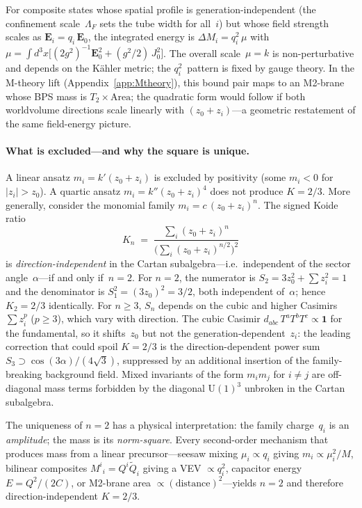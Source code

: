 \documentclass[12pt,a4paper]{article}
\newcommand{\UU}{\mathrm{U}}
\begin{document}
For composite states whose spatial profile is generation-independent
(the confinement scale~$\Lambda_F$ sets the tube width for all~$i$)
but whose field strength scales as $\mathbf{E}_i = q_i\,
\mathbf{E}_0$, the integrated energy is
$\Delta M_i = q_i^2\,\mu$ with
$\mu = \!\int\!d^3x\bigl[(2g^2)^{-1}\mathbf{E}_0^2
+ (g^2/2)\,J_0^2\bigr]$.
The overall scale~$\mu = k$ is non-perturbative and depends on
the K\"ahler metric; the $q_i^2$~pattern is fixed by gauge theory.
In the M-theory lift (Appendix~\ref{app:Mtheory}), this
bound pair maps to an M2-brane whose BPS mass is
$T_2 \times \text{Area}$; the quadratic form would follow if
both worldvolume directions scale linearly with
$(z_0{+}z_i)$---a geometric restatement
of the same field-energy picture.

\paragraph{What is excluded---and why the square is unique.}
A linear ansatz $m_i = k'(z_0 + z_i)$ is excluded by
positivity (some $m_i < 0$ for $|z_i| > z_0$). A quartic ansatz
$m_i = k''(z_0+z_i)^4$ does not produce $K = 2/3$.
More generally, consider the monomial family
$m_i = c\,(z_0 + z_i)^n$. The signed Koide ratio
\begin{equation}
  K_n \;=\; \frac{\sum_i (z_0{+}z_i)^n}
    {\bigl(\sum_i (z_0{+}z_i)^{n/2}\bigr)^2}
  \label{eq:Kn}
\end{equation}
is \emph{direction-independent} in the Cartan subalgebra---i.e.\
independent of the sector angle~$\alpha$---if and only if~$n = 2$.
For $n=2$, the numerator is $S_2 = 3z_0^2 + \sum z_i^2 = 1$
and the denominator is $S_1^2 = (3z_0)^2 = 3/2$, both
independent of~$\alpha$; hence $K_2 = 2/3$ identically.
For $n \geq 3$, $S_n$ depends on the cubic and higher Casimirs
$\sum z_i^p$ ($p\geq 3$), which vary with direction.
The cubic Casimir $d_{abc}\,T^a T^b T^c \propto \mathbf{1}$ for
the fundamental, so it shifts~$z_0$ but not the
generation-dependent~$z_i$: the leading correction that could
spoil $K = 2/3$ is the direction-dependent power sum
$S_3 \supset \cos(3\alpha)/(4\sqrt{3})$, suppressed by an additional
insertion of the family-breaking background field.
Mixed invariants of the form $m_i m_j$ for $i\neq j$ are
off-diagonal mass terms forbidden by the diagonal $\UU(1)^3$
unbroken in the Cartan subalgebra.

The uniqueness of $n=2$ has a physical interpretation:
the family charge~$q_i$ is an \emph{amplitude}; the
mass is its \emph{norm-square}.  Every second-order mechanism
that produces mass from a linear precursor---seesaw mixing
$\mu_i \propto q_i$ giving $m_i \propto \mu_i^2/M$,
bilinear composites $M^i{}_i = Q^i\tilde{Q}_i$ giving a VEV
$\propto q_i^2$, capacitor energy $E = Q^2/(2C)$,
or M2-brane area $\propto (\text{distance})^2$---yields $n=2$
and therefore direction-independent $K = 2/3$.
\end{document}
